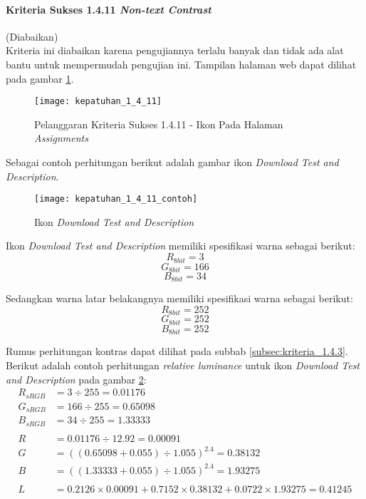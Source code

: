 \paragraph{Kriteria Sukses 1.4.11 \textit{Non-text Contrast}}
\label{subsubsec:kepatuhan_kriteria_1.4.11}
(Diabaikan) \\

Kriteria ini diabaikan karena pengujiannya terlalu banyak dan tidak ada alat bantu untuk mempermudah pengujian ini. Tampilan halaman web dapat dilihat pada gambar \ref{fig:kepatuhan_1_4_11_non_text_contrast}.
\begin{figure}[H]
	\centering  
	\texttt{[image: kepatuhan\_1\_4\_11]}  
	\caption[Pelanggaran Kriteria Sukses 1.4.11 - Ikon Pada Halaman \textit{Assignments}]{Pelanggaran Kriteria Sukses 1.4.11 - Ikon Pada Halaman \textit{Assignments}} 
	\label{fig:kepatuhan_1_4_11_non_text_contrast} 
\end{figure}

Sebagai contoh perhitungan berikut adalah gambar ikon \textit{Download Test and Description}.
\begin{figure}[H]
	\centering  
	\texttt{[image: kepatuhan\_1\_4\_11\_contoh]}  
	\caption[Ikon \textit{Download Test and Description}]{Ikon \textit{Download Test and Description}} 
	\label{fig:kepatuhan_1_4_11_contoh} 
\end{figure}

Ikon \textit{Download Test and Description} memiliki spesifikasi warna sebagai berikut:
\[
R_{8bit} = 3
\]
\[
G_{8bit} = 166
\]
\[
B_{8bit} = 34
\]

Sedangkan warna latar belakangnya memiliki spesifikasi warna sebagai berikut:
\[
R_{8bit} = 252
\]
\[
G_{8bit} = 252
\]
\[
B_{8bit} = 252
\]

Rumus perhitungan kontras dapat dilihat pada subbab \ref{subsec:kriteria_1.4.3}. Berikut adalah contoh perhitungan \textit{relative luminance} untuk ikon \textit{Download Test and Description} pada gambar \ref{fig:kepatuhan_1_4_11_contoh}:
\begin{align*}
	R_{sRGB} &= 3 \div 255 = 0.01176 \\
	G_{sRGB} &= 166 \div 255 = 0.65098 \\
	B_{sRGB} &= 34 \div 255 = 1.33333 \\
	\\
	R &= 0.01176 \div 12.92 = 0.00091 \\
	G &= ((0.65098 + 0.055) \div 1.055)^{2.4} = 0.38132 \\
	B &= ((1.33333 + 0.055) \div 1.055)^{2.4} = 1.93275 \\
	\\
	L &= 0.2126 \times 0.00091 + 0.7152 \times 0.38132 + 0.0722 \times 1.93275 = 0.41245
\end{align*}

